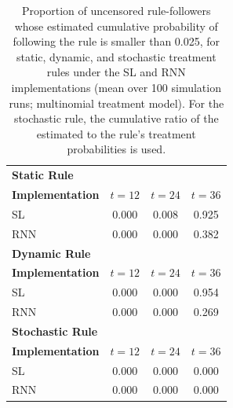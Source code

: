 \begin{table}[h]
\centering
\caption{Proportion of uncensored rule-followers whose estimated cumulative probability of following the rule is smaller than 0.025, for static, dynamic, and stochastic treatment rules under the SL and RNN implementations (mean over 100 simulation runs; multinomial treatment model). For the stochastic rule, the cumulative ratio of the estimated to the rule's treatment probabilities is used.}
\label{tab:positivity}
\begin{tabular}{l|ccc}
\toprule
\multicolumn{4}{l}{\textbf{Static Rule}} \\ 
\textbf{Implementation} & $t=12$ & $t=24$ & $t=36$ \\ 
\midrule
SL & 0.000 & 0.008 & 0.925 \\ 
RNN & 0.000 & 0.000 & 0.382 \\ 
\midrule
\multicolumn{4}{l}{\textbf{Dynamic Rule}} \\ 
\textbf{Implementation} & $t=12$ & $t=24$ & $t=36$ \\ 
\midrule
SL & 0.000 & 0.000 & 0.954 \\ 
RNN & 0.000 & 0.000 & 0.269 \\ 
\midrule
\multicolumn{4}{l}{\textbf{Stochastic Rule}} \\ 
\textbf{Implementation} & $t=12$ & $t=24$ & $t=36$ \\ 
\midrule
SL & 0.000 & 0.000 & 0.000 \\ 
RNN & 0.000 & 0.000 & 0.000 \\ 
\bottomrule
\end{tabular}
\end{table}

